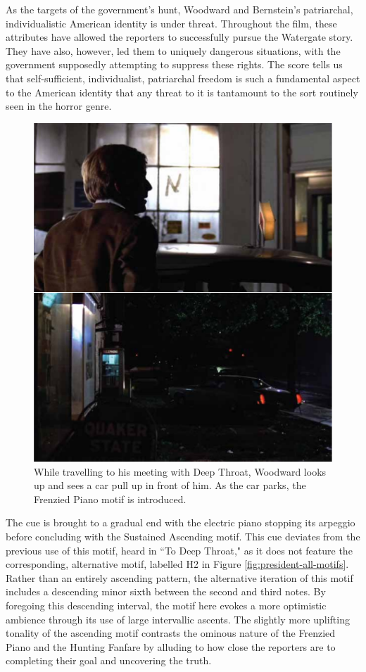 As the targets of the government's hunt, Woodward and Bernstein's patriarchal, individualistic American identity is under threat.
Throughout the film, these attributes have allowed the reporters to successfully pursue the Watergate story.
They have also, however, led them to uniquely dangerous situations, with the government supposedly attempting to suppress these rights.
The score tells us that self-sufficient, individualist, patriarchal freedom is such a fundamental aspect to the American identity that any threat to it is tantamount to the sort routinely seen in the horror genre.
\begin{figure}
    \centering
    \includegraphics[width=0.5\linewidth]{img/president-frenzied-intro.pdf}
    \caption{While travelling to his meeting with Deep Throat, Woodward looks up and sees a car pull up in front of him. As the car parks, the Frenzied Piano motif is introduced.}
    \label{fig:president-frenzied-intro}
\end{figure}

The cue is brought to a gradual end with the electric piano stopping its arpeggio before concluding with the Sustained Ascending motif.
This cue deviates from the previous use of this motif, heard in ``To Deep Throat," as it does not feature the corresponding, alternative motif, labelled H2 in Figure \ref{fig:president-all-motifs}.
Rather than an entirely ascending pattern, the alternative iteration of this motif includes a descending minor sixth between the second and third notes.
By foregoing this descending interval, the motif here evokes a more optimistic ambience through its use of large intervallic ascents.
The slightly more uplifting tonality of the ascending motif contrasts the ominous nature of the Frenzied Piano and the Hunting Fanfare by alluding to how close the reporters are to completing their goal and uncovering the truth.

